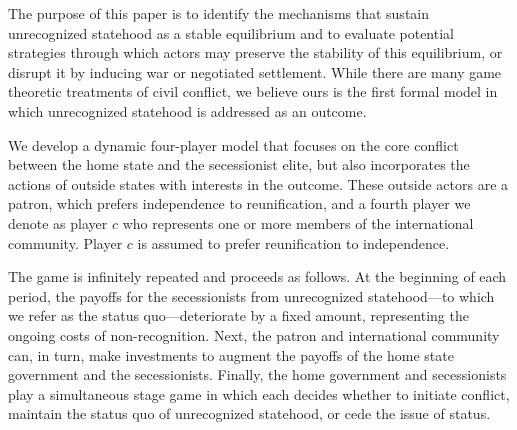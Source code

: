 \documentclass[11pt,letterpaper, notitlepage]{article}
\begin{document}


The purpose of this paper is to identify the mechanisms that sustain unrecognized statehood as a stable equilibrium and to evaluate potential strategies through which actors may preserve the stability of this equilibrium, or disrupt it by inducing war or negotiated settlement. While there are many game theoretic treatments of civil conflict, we believe ours is the first formal model in which unrecognized statehood is addressed as an outcome.

We develop a dynamic four-player model that focuses on the core conflict between the home state and the secessionist elite, but also incorporates the actions of outside states with interests in the outcome. These outside actors are a patron, which prefers independence to reunification, and a fourth player we denote as player $c$ who represents one or more members of the international community. Player $c$ is assumed to prefer reunification to independence. 

The game is infinitely repeated and proceeds as follows. At the beginning of each period, the payoffs for the secessionists from unrecognized statehood---to which we refer as the status quo---deteriorate by a fixed amount, representing the ongoing costs of non-recognition. Next, the patron and international community can, in turn, make investments to augment the payoffs of the home state government and the secessionists. Finally, the home government and secessionists play a simultaneous stage game in which each decides whether to initiate conflict, maintain the status quo of unrecognized statehood, or cede the issue of status.
\end{document}
